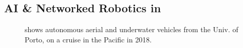 \subsection{AI \& Networked Robotics in \proje}

\begin{figure}[!t]
  \centering 
  \hspace{+0.5cm} 
  \caption{ shows autonomous aerial and
    underwater vehicles from the Univ. of Porto, on a cruise in the
    Pacific in 2018.  %
}
\end{figure}
